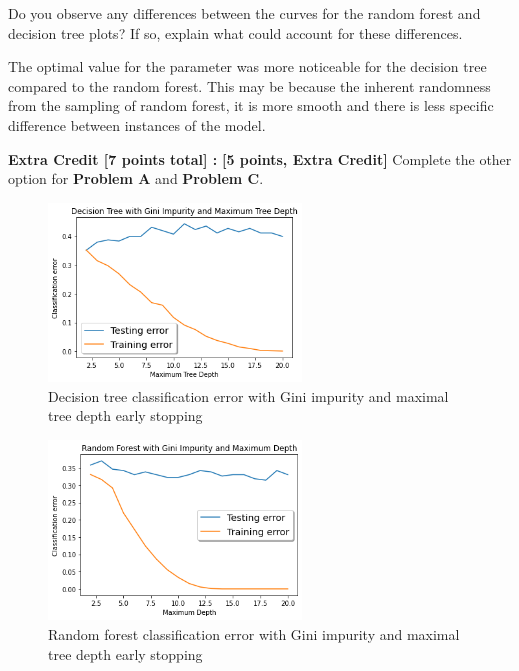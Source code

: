 \newpage

\problem[4]
Do you observe any differences between the curves for the random forest and decision tree plots? If so, explain what could account for these differences.

\begin{solution}
    The optimal value for the parameter was more noticeable for the decision tree compared to the random forest. This may be because the inherent randomness from the sampling of random forest, it is more smooth and there is less specific difference between instances of the model.
\end{solution}

\textbf{Extra Credit [7 points total] :} \problem\textbf{[5 points, Extra Credit]} Complete the other option for \textbf{Problem A }and \textbf{Problem C}.

\begin{solution}
    \begin{figure}[H]
        \centering
        \includegraphics[width=0.6\textwidth]{plots/2a2.png}
        \caption{Decision tree classification error with Gini impurity and maximal tree depth early stopping}
        \label{fig:2a2}
    \end{figure}

    \begin{figure}[H]
        \centering
        \includegraphics[width=0.6\textwidth]{plots/2c2.png}
        \caption{Random forest classification error with Gini impurity and maximal tree depth early stopping}
        \label{fig:2c2}
    \end{figure}
\end{solution}

